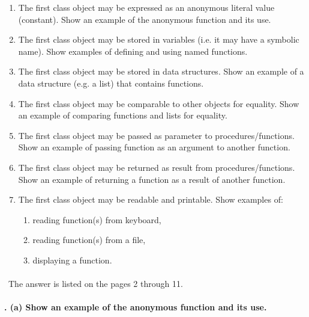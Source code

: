 \documentclass{article}
\begin{document}
		\begin{enumerate}[label=\alph*)]
		
			\item The first class object may be expressed as an anonymous literal value (constant). Show an example of the anonymous function and its use.
			
			\item The first class object may be stored in variables (i.e. it may have a symbolic name). Show examples of defining and using named functions.
			
			\item The first class object may be stored in data structures. Show an example of a data structure (e.g. a list) that contains functions.
			
			\item The first class object may be comparable to other objects for equality. Show an example of comparing functions and lists for equality.
			
			\item The first class object may be passed as parameter to procedures/functions. Show an example of passing function as an argument to another function.
			
			\item The first class object may be returned as result from procedures/functions. Show an example of returning a function as a result of another function.
			
			\item The first class object may be readable and printable. Show examples of:
				\begin{enumerate}[label=-]
				
					\item reading function(s) from keyboard,
					
					\item reading function(s) from a file,
					
					\item displaying a function.
					
				\end{enumerate}
			
		\end{enumerate}
		
\paragraph{}\
		The answer is listed on the pages 2 through 11.
\paragraph{. (a) Show an example of the anonymous function and its use.}\
\end{document}
